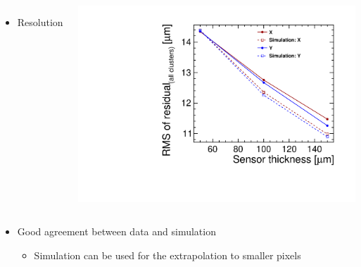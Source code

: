 \begin{frame}
\begin{columns}
    \begin{itemize}
    \item Resolution
    \end{itemize}
    \centering
    \includegraphics[width=\textwidth]{../figures/TestBeam/residuals_vs_thickness.pdf}
  \end{columns}

  \begin{itemize}
  \item Good agreement between data and simulation 
    \begin{itemize}
    \item Simulation can be used for the extrapolation to smaller
      pixels
    \end{itemize}
  \end{itemize}

\end{frame}
